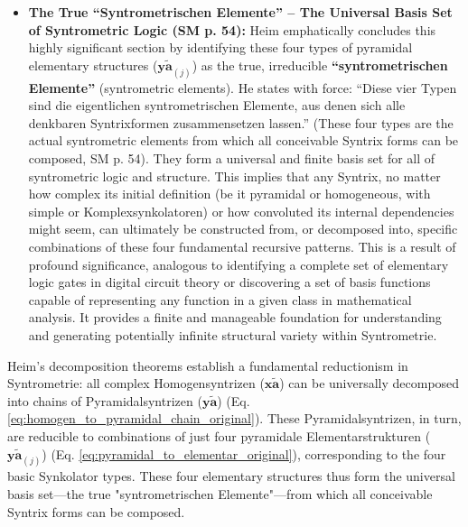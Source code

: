 \documentclass[12pt]{article}
\newcommand{\q}[1]{\enquote{#1}}
\newcommand{\syntrix}{\bm{y\widetilde{a}}}
\newcommand{\homogeneoussyntrix}{\bm{x\widetilde{a}}}
\newcommand{\elementarstruktur}{\bm{y\widetilde{a}}_{(j)}}
\begin{document}
\begin{itemize}
    \begin{enumerate}
        \item Pyramidalsyntrix with a \textbf{Heterometral, Symmetric} Synkolator type.
        \item Pyramidalsyntrix with a \textbf{Heterometral, Asymmetric} Synkolator type.
        \item Pyramidalsyntrix with a \textbf{Homometral, Symmetric} Synkolator type.
        \item Pyramidalsyntrix with a \textbf{Homometral, Asymmetric} Synkolator type.
    \end{enumerate}
    Each of these four elementary pyramidal structures is defined by a Synkolator that exhibits only one of these four unique and mutually exclusive combinations of metrality and symmetry. They represent the simplest, non-decomposable modes of pyramidal generation.

    \item \textbf{The True \q{Syntrometrischen Elemente} – The Universal Basis Set of Syntrometric Logic (SM p. 54):}
    Heim emphatically concludes this highly significant section by identifying these four types of pyramidal elementary structures (\(\elementarstruktur\)) as the true, irreducible \textbf{\q{syntrometrischen Elemente}} (syntrometric elements). He states with force: \q{Diese vier Typen sind die eigentlichen syntrometrischen Elemente, aus denen sich alle denkbaren Syntrixformen zusammensetzen lassen.} (These four types are the actual syntrometric elements from which all conceivable Syntrix forms can be composed, SM p. 54). They form a universal and finite basis set for all of syntrometric logic and structure. This implies that any Syntrix, no matter how complex its initial definition (be it pyramidal or homogeneous, with simple or Komplexsynkolatoren) or how convoluted its internal dependencies might seem, can ultimately be constructed from, or decomposed into, specific combinations of these four fundamental recursive patterns. This is a result of profound significance, analogous to identifying a complete set of elementary logic gates in digital circuit theory or discovering a set of basis functions capable of representing any function in a given class in mathematical analysis. It provides a finite and manageable foundation for understanding and generating potentially infinite structural variety within Syntrometrie.
\end{itemize}

Heim's decomposition theorems establish a fundamental reductionism in Syntrometrie: all complex Homogensyntrizen (\(\homogeneoussyntrix\)) can be universally decomposed into chains of Pyramidalsyntrizen (\(\syntrix\)) (Eq. \eqref{eq:homogen_to_pyramidal_chain_original}). These Pyramidalsyntrizen, in turn, are reducible to combinations of just four pyramidale Elementarstrukturen (\(\elementarstruktur\)) (Eq. \eqref{eq:pyramidal_to_elementar_original}), corresponding to the four basic Synkolator types. These four elementary structures thus form the universal basis set—the true "syntrometrischen Elemente"—from which all conceivable Syntrix forms can be composed.
\end{document}
